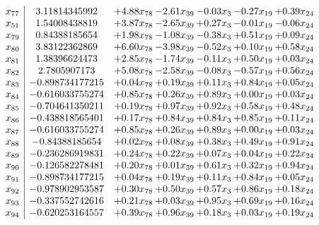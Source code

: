 \documentclass[8pt]{article}
\begin{document}
\[\begin{array}{c| c c@{\hskip 2pt} c@{\hskip 2pt} c@{\hskip 2pt} c@{\hskip 2pt} c@{\hskip 2pt} }
 x_{77}   &  3.11814345992 & +  4.88 x_{78} & -2.61 x_{39} & -0.03 x_{3} & -0.27 x_{19} & +  0.39 x_{24}\\
 x_{51}   &  1.54008438819 & +  3.87 x_{78} & -2.65 x_{39} & +  0.27 x_{3} & -0.01 x_{19} & -0.06 x_{24}\\
 x_{79}   &  0.84388185654 & +  1.98 x_{78} & -1.08 x_{39} & -0.38 x_{3} & +  0.51 x_{19} & +  0.09 x_{24}\\
 x_{80}   &  3.83122362869 & +  6.60 x_{78} & -3.98 x_{39} & -0.52 x_{3} & +  0.10 x_{19} & +  0.58 x_{24}\\
 x_{81}   &  1.38396624473 & +  2.85 x_{78} & -1.74 x_{39} & -0.11 x_{3} & +  0.50 x_{19} & +  0.03 x_{24}\\
 x_{82}   &  2.7805907173 & +  5.08 x_{78} & -2.58 x_{39} & -0.08 x_{3} & -0.57 x_{19} & +  0.56 x_{24}\\
 x_{83}   &  -0.898734177215 & +  0.04 x_{78} & +  0.19 x_{39} & +  0.11 x_{3} & +  0.84 x_{19} & +  0.05 x_{24}\\
 x_{84}   &  -0.616033755274 & +  0.85 x_{78} & +  0.26 x_{39} & +  0.89 x_{3} & +  0.00 x_{19} & +  0.03 x_{24}\\
 x_{85}   &  -0.704641350211 & +  0.19 x_{78} & +  0.97 x_{39} & +  0.92 x_{3} & +  0.58 x_{19} & +  0.48 x_{24}\\
 x_{86}   &  -0.438818565401 & +  0.17 x_{78} & +  0.84 x_{39} & +  0.84 x_{3} & +  0.85 x_{19} & +  0.11 x_{24}\\
 x_{87}   &  -0.616033755274 & +  0.85 x_{78} & +  0.26 x_{39} & +  0.89 x_{3} & +  0.00 x_{19} & +  0.03 x_{24}\\
 x_{88}   &  -0.84388185654 & +  0.02 x_{78} & +  0.08 x_{39} & +  0.38 x_{3} & +  0.49 x_{19} & +  0.91 x_{24}\\
 x_{89}   &  -0.236286919831 & +  0.24 x_{78} & +  0.22 x_{39} & +  0.07 x_{3} & +  0.04 x_{19} & +  0.22 x_{24}\\
 x_{90}   &  -0.126582278481 & +  0.20 x_{78} & +  0.01 x_{39} & +  0.61 x_{3} & +  0.32 x_{19} & +  0.94 x_{24}\\
 x_{91}   &  -0.898734177215 & +  0.04 x_{78} & +  0.19 x_{39} & +  0.11 x_{3} & +  0.84 x_{19} & +  0.05 x_{24}\\
 x_{92}   &  -0.978902953587 & +  0.30 x_{78} & +  0.50 x_{39} & +  0.57 x_{3} & +  0.86 x_{19} & +  0.18 x_{24}\\
 x_{93}   &  -0.337552742616 & +  0.21 x_{78} & +  0.03 x_{39} & +  0.95 x_{3} & +  0.69 x_{19} & +  0.16 x_{24}\\
 x_{94}   &  -0.620253164557 & +  0.39 x_{78} & +  0.96 x_{39} & +  0.18 x_{3} & +  0.03 x_{19} & +  0.19 x_{24}\\

\end{array}\]
\end{document}
